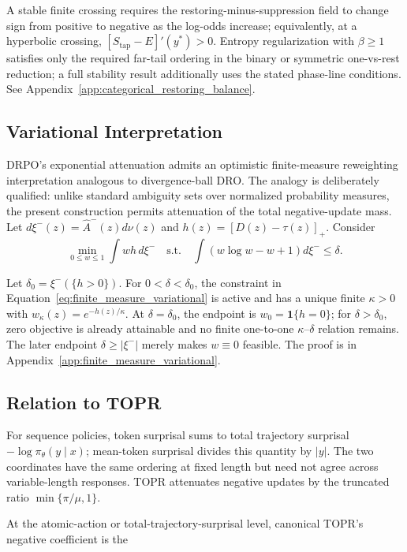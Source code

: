 \begin{remark}
A stable finite crossing requires the restoring-minus-suppression field to
change sign from positive to negative as the log-odds increase; equivalently,
at a hyperbolic crossing, \([S_{\mathrm{tap}}-E]'(y^*)>0\). Entropy regularization with
\(\beta\ge1\) satisfies only the required far-tail ordering in the binary or
symmetric one-vs-rest reduction; a full stability result additionally uses
the stated phase-line conditions. See
Appendix~\ref{app:categorical_restoring_balance}.
\end{remark}

\subsection{Variational Interpretation}

DRPO's exponential attenuation admits an optimistic finite-measure
reweighting interpretation analogous to divergence-ball DRO. The analogy
is deliberately qualified: unlike standard ambiguity sets over normalized
probability measures, the present construction permits attenuation of the
total negative-update mass. Let
\(d\xi^-(z)=\widehat A^-(z)d\nu(z)\) and
\(h(z)=[D(z)-\tau(z)]_+\). Consider
\begin{equation}
\min_{0\le w\le1}\int wh\,d\xi^-
\quad\mathrm{s.t.}\quad
\int(w\log w-w+1)d\xi^-\le\delta.
\label{eq:finite_measure_variational}
\end{equation}

\begin{proposition}
\label{prop:finite_measure_variational}
Let \(\delta_0=\xi^-(\{h>0\})\). For
\(0<\delta<\delta_0\), the constraint in
Equation~\eqref{eq:finite_measure_variational} is active and has a unique
finite \(\kappa>0\) with
\(w_\kappa(z)=e^{-h(z)/\kappa}\). At \(\delta=\delta_0\), the endpoint is
\(w_0=\mathbf1\{h=0\}\); for \(\delta>\delta_0\), zero objective is
already attainable and no finite one-to-one \(\kappa\)--\(\delta\)
relation remains. The later endpoint \(\delta\ge|\xi^-|\) merely makes
\(w\equiv0\) feasible. The proof is in
Appendix~\ref{app:finite_measure_variational}.
\end{proposition}

\subsection{Relation to TOPR}

For sequence policies, token surprisal sums to total trajectory surprisal
\(-\log\pi_\theta(y\mid x)\); mean-token surprisal divides this quantity by
\(|y|\). The two coordinates have the same ordering at fixed length but need
not agree across variable-length responses. TOPR attenuates negative updates
by the truncated ratio \(\min\{\pi/\mu,1\}\).

At the atomic-action or total-trajectory-surprisal level, canonical TOPR's
negative coefficient is the 